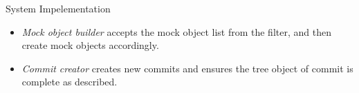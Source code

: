 \documentclass[final]{beamer}
\begin{document}
\begin{frame}[t, fragile]
\begin{columns}[t]
\begin{column}{.5\linewidth}
\begin{block}{System Impelementation}
\begin{itemize}
  \item \emph{Mock object builder} accepts the mock object list
    from the filter, and then create mock objects accordingly.

  \item \emph{Commit creator} creates new commits and ensures
    the tree object of commit is complete as described.
\end{itemize}
      \end{block}
    \end{column}
  \end{columns}
\end{frame}
\end{document}

